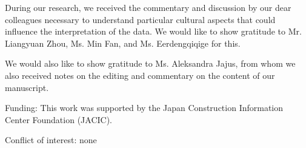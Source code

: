 \documentclass[smallextended,natbib]{svjour3}       %
\begin{document}
\date{Received: date / Accepted: date}

\maketitle

\begin{acknowledgements}

During our research, we received the commentary and discussion by our dear colleagues necessary to understand particular cultural aspects that could influence the interpretation of the data. We would like to show gratitude to Mr. Liangyuan Zhou, Ms. Min Fan, and Ms. Eerdengqiqige for this.

We would also like to show gratitude to Ms. Aleksandra Jajus, from whom we also received notes on the editing and commentary on the content of our manuscript.

\medskip

Funding: This work was supported by the Japan Construction Information Center Foundation (JACIC).

\medskip

Conflict of interest: none

\end{acknowledgements}
\end{document}
